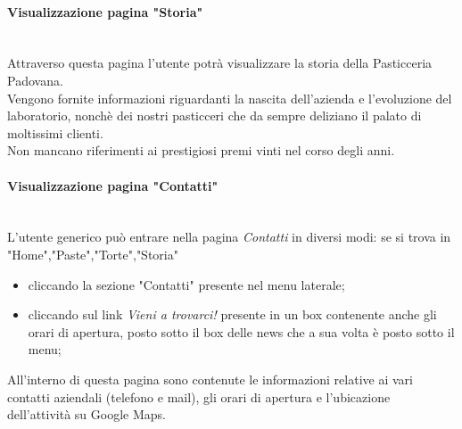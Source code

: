 \paragraph{Visualizzazione pagina "Storia"}\mbox{}\\
\label{par:VisStoria}
Attraverso questa pagina l'utente potrà visualizzare la storia della Pasticceria Padovana.\\
Vengono fornite informazioni riguardanti la nascita dell'azienda e l'evoluzione del laboratorio, nonchè dei nostri pasticceri che da sempre deliziano il palato di moltissimi clienti.\\
Non mancano riferimenti ai prestigiosi premi vinti nel corso degli anni.

\paragraph{Visualizzazione pagina "Contatti"}\mbox{}\\
\label{par:VisContatti}
L'utente generico può entrare nella pagina \emph{Contatti} in diversi modi: se si trova in "Home","Paste","Torte","Storia"
\begin{itemize}
	\item cliccando la sezione "Contatti" presente nel menu laterale; 
	\item cliccando sul link \emph{Vieni a trovarci!} presente in un box contenente anche gli orari di apertura, posto sotto il box delle news che a sua volta è posto sotto il menu;
\end{itemize}
All'interno di questa pagina sono contenute le informazioni relative ai vari contatti aziendali (telefono e mail),
gli orari di apertura e l'ubicazione dell'attività su Google Maps.
